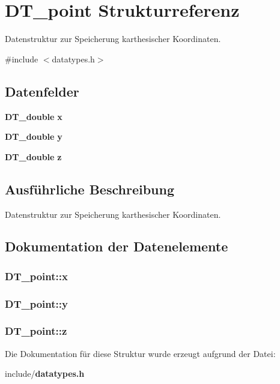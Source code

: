 \section{DT\_\-point Strukturreferenz}
\label{struct_d_t__point}


Datenstruktur zur Speicherung karthesischer Koordinaten.  




{\ttfamily \#include $<$datatypes.h$>$}

\subsection*{Datenfelder}
\begin{DoxyCompactItemize}
\item 
{\bf DT\_\-double} {\bf x}
\item 
{\bf DT\_\-double} {\bf y}
\item 
{\bf DT\_\-double} {\bf z}
\end{DoxyCompactItemize}


\subsection{Ausführliche Beschreibung}
Datenstruktur zur Speicherung karthesischer Koordinaten. 

\subsection{Dokumentation der Datenelemente}
\subsubsection[{x}]{ {\bf DT\_\-point::x}}\label{struct_d_t__point_a576ac8668e260383e4a8ddc4889ae17e}
\subsubsection[{y}]{ {\bf DT\_\-point::y}}\label{struct_d_t__point_a8a0364bcd5b39aff2422d44c70e831eb}
\subsubsection[{z}]{ {\bf DT\_\-point::z}}\label{struct_d_t__point_a3225544f53347fe30c76012f351be527}


Die Dokumentation für diese Struktur wurde erzeugt aufgrund der Datei:\begin{DoxyCompactItemize}
\item 
include/{\bf datatypes.h}\end{DoxyCompactItemize}
